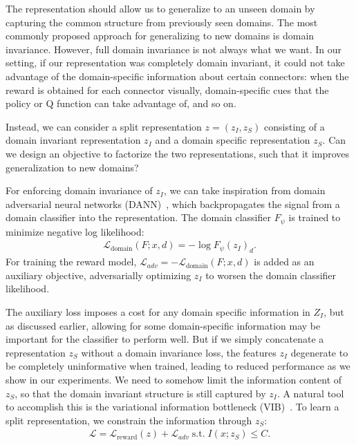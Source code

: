 \documentclass[letterpaper, 10 pt, conference, final]{ieeeconf}   %
\begin{document}
The representation should allow us to generalize to an unseen domain by capturing the common structure from previously seen domains. The most commonly proposed approach for generalizing to new domains is domain invariance. However, full domain invariance is not always what we want. In our setting, if our representation was completely domain invariant, it could not take advantage of the domain-specific information about certain connectors: when the reward is obtained for each connector visually, domain-specific cues that the policy or Q function can take advantage of, and so on.

Instead, we can consider a split representation $z = (z_I, z_S)$ consisting of a domain invariant representation $z_I$ and a domain specific representation $z_S$. Can we design an objective to factorize the two representations, such that it improves generalization to new domains?

For enforcing domain invariance of $z_I$, we can take inspiration from domain adversarial neural networks (DANN)~\cite{ganin2016domainadversarial}, which backpropagates the signal from a domain classifier into the representation. The domain classifier $F_\psi$ is trained to minimize negative log likelihood:
\begin{eqnarray}
\mathcal{L}_\text{domain}(F; x, d) = -\log F_\psi(z_I)_d.
\end{eqnarray}
For training the reward model, $\mathcal{L}_{adv} = -\mathcal{L}_\text{domain}(F; x, d)$ is added as an auxiliary objective, adversarially optimizing $z_I$ to worsen the domain classifier likelihood.

The auxiliary loss imposes a cost for any domain specific information in $Z_I$, but as discussed earlier, allowing for some domain-specific information may be important for the classifier to perform well. But if we simply concatenate a representation $z_S$ without a domain invariance loss, the features $z_I$ degenerate to be completely uninformative when trained, leading to reduced performance as we show in our experiments. We need to somehow limit the information content of $z_S$, so that the domain invariant structure is still captured by $z_I$. A natural tool to accomplish this is the variational information bottleneck (VIB)~\cite{alemi2017vib}. To learn a split representation, we constrain the information through $z_S$:
\begin{eqnarray}
\mathcal{L} = \mathcal{L}_{\text{reward}}(z) + \mathcal{L}_{adv} \; \text{s.t.} \; I(x; z_S) \leq C.
\end{eqnarray}
\end{document}
